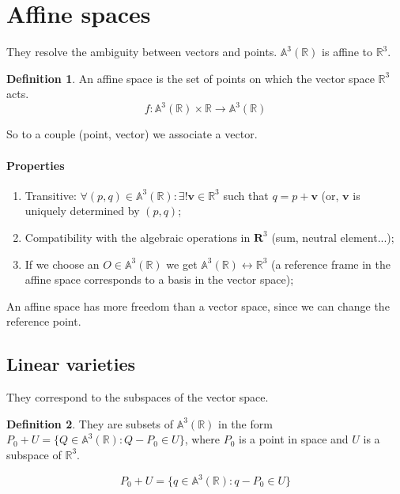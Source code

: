 \documentclass[12pt,a4paper]{report}
\numberwithin{equation}{section}
\theoremstyle{definition}
\newtheorem{definition}{Definition}[section]
\theoremstyle{remark}
\begin{document}
\section{Affine spaces}

They resolve the ambiguity between vectors and points. $\mathbb{A}^3 (\mathbb{R})$ is affine to $\mathbb{R}^3$.

\begin{definition}
An affine space is the set of points on which the vector space $\mathbb{R}^3$ acts.
\begin{equation}
f: \mathbb{A}^3 (\mathbb{R}) \times \mathbb{R} \rightarrow \mathbb{A}^3 (\mathbb{R})
\end{equation}

So to a couple (point, vector) we associate a vector.
\end{definition}

\paragraph{Properties}

\begin{enumerate}
\item Transitive: $\forall (p, q) \in \mathbb{A}^3 (\mathbb{R}): \exists ! \mathbf{v} \in \mathbb{R}^3$  such that  $q = p+\mathbf{v}$ (or, $\mathbf{v}$ is uniquely determined by $(p, q)$;
\item Compatibility with the algebraic operations in $\mathbf{R}^3$ (sum, neutral element...);
\item If we choose an $O \in \mathbb{A}^3 (\mathbb{R})$ we get $\mathbb{A}^3 (\mathbb{R}) \leftrightarrow \mathbb{R}^3$ (a reference frame in the affine space corresponds to a basis in the vector space);
\end{enumerate}

An affine space has more freedom than a vector space, since we can change the reference point.

\subsection{Linear varieties}

They correspond to the subspaces of the vector space. 

\begin{definition}
They are subsets of $\mathbb{A}^3 (\mathbb{R})$ in the form $P_0 + U = \lbrace Q \in \mathbb{A}^3 (\mathbb{R}) : Q-P_0 \in U\rbrace$, where $P_0$ is a point in space and $U$ is a subspace of $\mathbb{R}^3$.

\begin{equation}
P_0 + U = \lbrace q \in \mathbb{A}^3 (\mathbb{R}): q-P_0 \in U\rbrace
\end{equation}
\end{definition}
\end{document}
